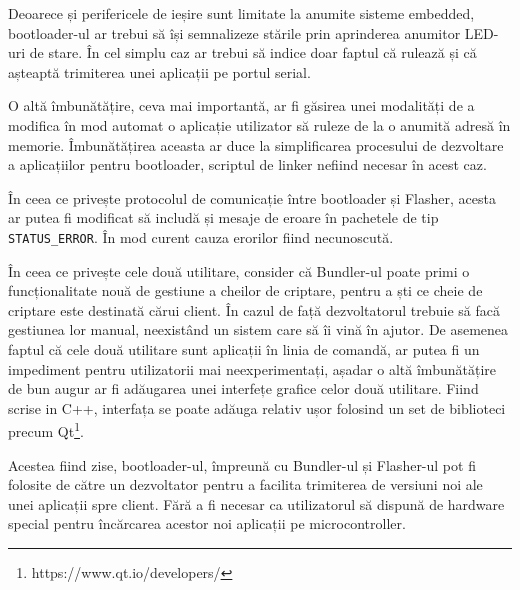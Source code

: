 \documentclass[12pt,a4paper,titlepage]{report}
\begin{document}
Deoarece și perifericele de ieșire sunt limitate la anumite sisteme embedded, bootloader-ul ar trebui să își semnalizeze stările prin aprinderea anumitor LED-uri de stare. În cel simplu caz ar trebui să indice doar faptul că rulează și că așteaptă trimiterea unei aplicații pe portul serial.

O altă îmbunătățire, ceva mai importantă, ar fi găsirea unei modalități de a modifica în mod automat o aplicație utilizator să ruleze de la o anumită adresă în memorie. Îmbunătățirea aceasta ar duce la simplificarea procesului de dezvoltare a aplicațiilor pentru bootloader, scriptul de linker nefiind necesar în acest caz.

În ceea ce privește protocolul de comunicație între bootloader și Flasher, acesta ar putea fi modificat să includă și mesaje de eroare în pachetele de tip \texttt{STATUS\_ERROR}. În mod curent cauza erorilor fiind necunoscută.

În ceea ce privește cele două utilitare, consider că Bundler-ul poate primi o funcționalitate nouă de gestiune a cheilor de criptare, pentru a ști ce cheie de criptare este destinată cărui client. În cazul de față dezvoltatorul trebuie să facă gestiunea lor manual, neexistând un sistem care să îi vină în ajutor. De asemenea faptul că cele două utilitare sunt aplicații în linia de comandă, ar putea fi un impediment pentru utilizatorii mai neexperimentați, așadar o altă îmbunătățire de bun augur ar fi adăugarea unei interfețe grafice celor două utilitare. Fiind scrise in C++, interfața se poate adăuga relativ ușor folosind un set de biblioteci precum Qt\footnote{https://www.qt.io/developers/}.

Acestea fiind zise, bootloader-ul, împreună cu Bundler-ul și Flasher-ul pot fi folosite de către un dezvoltator pentru a facilita trimiterea de versiuni noi ale unei aplicații spre client. Fără a fi necesar ca utilizatorul să dispună de hardware special pentru încărcarea acestor noi aplicații pe microcontroller.


\newpage


\end{document}
